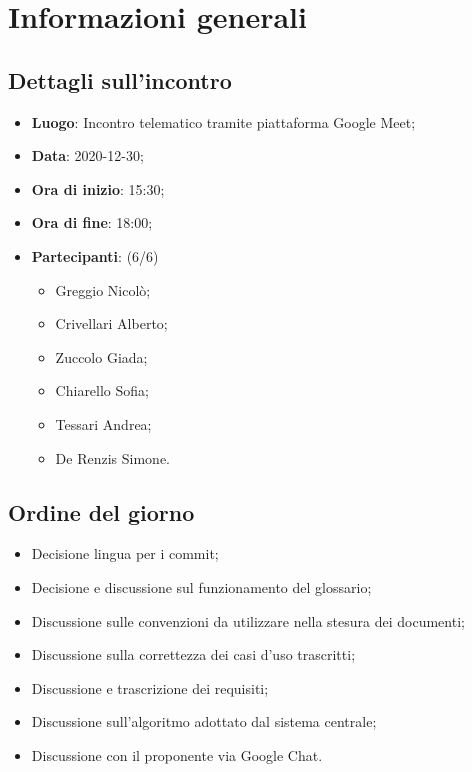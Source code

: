 \section{Informazioni generali}

\subsection{Dettagli sull'incontro}
\begin{itemize}
\item \textbf{Luogo}: Incontro telematico tramite piattaforma Google Meet;
\item \textbf{Data}: 2020-12-30;
\item \textbf{Ora di inizio}: 15:30;
\item \textbf{Ora di fine}: 18:00;
\item \textbf{Partecipanti}: (6/6) 
\begin{itemize}
	\item Greggio Nicolò;
	\item Crivellari Alberto;
	\item Zuccolo Giada;
	\item Chiarello Sofia;
	\item Tessari Andrea;
	\item De Renzis Simone.
\end{itemize}
\end{itemize}

\subsection{Ordine del giorno}
\begin{itemize}
	\item Decisione lingua per i commit;
	\item Decisione e discussione sul funzionamento del glossario;
	\item Discussione sulle convenzioni da utilizzare nella stesura dei documenti;
	\item Discussione sulla correttezza dei casi d'uso trascritti;
	\item Discussione e trascrizione dei requisiti;
	\item Discussione sull'algoritmo adottato dal sistema centrale;
	\item Discussione con il proponente via Google Chat.

\end{itemize}


